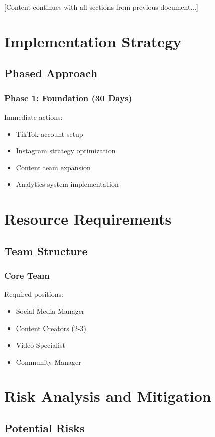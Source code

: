 \documentclass[12pt]{report}
\begin{document}
[Content continues with all sections from previous document...]

\chapter{Implementation Strategy}

\section{Phased Approach}
\subsection{Phase 1: Foundation (30 Days)}
Immediate actions:
\begin{itemize}
    \item TikTok account setup
    \item Instagram strategy optimization
    \item Content team expansion
    \item Analytics system implementation
\end{itemize}

\chapter{Resource Requirements}

\section{Team Structure}
\subsection{Core Team}
Required positions:
\begin{itemize}
    \item Social Media Manager
    \item Content Creators (2-3)
    \item Video Specialist
    \item Community Manager
\end{itemize}

\chapter{Risk Analysis and Mitigation}

\section{Potential Risks}
\end{document}
